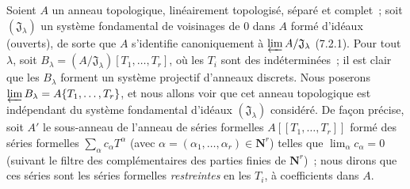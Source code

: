\begin{env}[7.5.1]
\label{0.7.5.1-fr}
Soient $A$ un anneau topologique, linéairement topologisé, séparé et complet~;
soit $(\mathfrak J_\lambda)$ un système fondamental de voisinages de $0$ dans
$A$ formé d'idéaux (ouverts), de sorte que $A$ s'identifie canoniquement à
$\varprojlim A/\mathfrak J_\lambda$ (7.2.1). Pour tout $\lambda$, soit
$B_\lambda=(A/\mathfrak J_\lambda)[T_1,\ldots,T_r]$, où les $T_i$ sont des
indéterminées~; il est clair que les $B_\lambda$ forment un système projectif
d'anneaux discrets. Nous poserons
$\varprojlim B_\lambda=A\{T_1,\ldots,T_r\}$, et nous allons voir que cet anneau
topologique est indépendant du système fondamental d'idéaux
$(\mathfrak J_\lambda)$ considéré. De façon précise, soit $A'$ le sous-anneau
de l'anneau de séries formelles $A[\![T_1,\ldots,T_r]\!]$ formé des séries
formelles $\sum_\alpha c_\alpha T^\alpha$ (avec
$\alpha=(\alpha_1,\ldots,\alpha_r)\in\mathbf{N}^r$) telles que
$\lim_\alpha c_\alpha=0$ (suivant le filtre des complémentaires des parties
finies de $\mathbf{N}^r$)~; nous dirons que ces séries sont les séries
formelles \emph{restreintes} en les $T_i$, à coefficients dans $A$.



\end{env}
